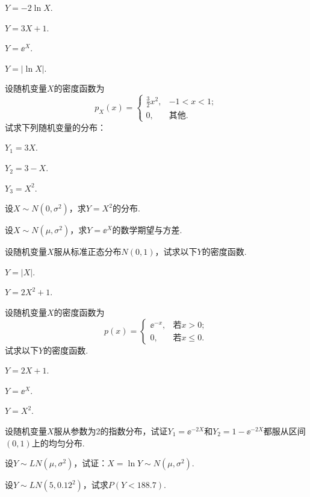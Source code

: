 \begin{xiti}
      \begin{inparaenum}[(1)]
        \item $Y=-2\ln X$. \item $Y=3X+1$. \item $Y=\ee^X$. \item $Y=|\ln X|$.
      \end{inparaenum}

  \item 设随机变量$X$的密度函数为
  \[
    p_X(x) = \begin{cases}
      \frac32x^2, & -1 < x < 1;\\
      0, & \text{其他}.
    \end{cases}
  \]
  试求下列随机变量的分布：\begin{inparaenum}[(1)]
    \item $Y_1=3X$. \item $Y_2=3-X$. \item $Y_3=X^2$.
  \end{inparaenum}

  \item 设$X\sim N(0,\sigma^2)$，求$Y=X^2$的分布.

  \item 设$X\sim N(\mu,\sigma^2)$，求$Y=\ee^X$的数学期望与方差.

  \item 设随机变量$X$服从标准正态分布$N(0,1)$，试求以下$Y$的密度函数.

      \begin{inparaenum}[(1)]
        \item $Y=|X|$. \item $Y=2X^2+1$.
      \end{inparaenum}

  \item 设随机变量$X$的密度函数为
  \[
    p(x) = \begin{cases}
      \ee^{-x}, & \text{若$x>0$};\\
      0, & \text{若$x\le0$}.
    \end{cases}
  \]
  试求以下$Y$的密度函数.

  \begin{inparaenum}[(1)]
    \item $Y=2X+1$. \item $Y=\ee^X$. \item $Y=X^2$.
  \end{inparaenum}

  \item 设随机变量$X$服从参数为2的指数分布，试证$Y_1=\ee^{-2X}$和$Y_2=1-\ee^{-2X}$都服从区间$(0,1)$上的均匀分布.

  \item 设$Y\sim LN(\mu,\sigma^2)$，试证：$X=\ln Y\sim N(\mu,\sigma^2)$.

  \item 设$Y\sim LN(5,0.12^2)$，试求$P(Y<188.7)$.
\end{xiti}

